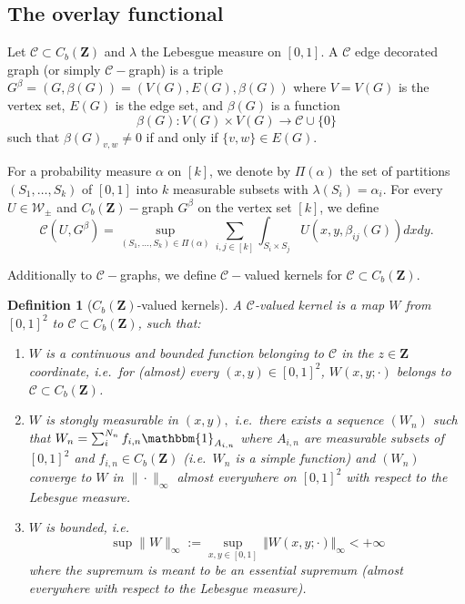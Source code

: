 \documentclass[11pt]{article}
\newtheorem{definition}[theorem]{Definition}
\newcommand{\cC}{{\mathcal C}}  %
\newcommand{\Space}{\mathbf{Z}}
\newcommand{\signed}{\pm}
\newcommand{\CbFunct}{C_b(\Space)}
\newcommand{\Kernel}{\mathcal{W}_{\signed}}
\newcommand{\TotalMass}[1]{\norm{#1}_\infty}
\newcommand{\norm}[1]{\Vert#1\Vert}
\begin{document}
\subsection{The overlay functional}
Let $\cC\subset \CbFunct$ and $\lambda$ the Lebesgue measure on $[0,1].$ A $\cC$ edge decorated graph (or simply $\cC-$graph) is a triple $G^{\beta}=(G,\beta(G))=(V(G),E(G),\beta(G))$ where $V=V(G)$ is the vertex set, $E(G)$ is the edge set, and $\beta(G)$ is a function
$$
\beta(G):V(G)\times V(G)\rightarrow \cC \cup \{0\}$$
such that $\beta(G)_{v,w}\neq 0$ if and only if $\{v,w\}\in E(G).$

For a probability measure $\alpha$ on $[k]$, we denote by $\Pi(\alpha)$ the set of partitions $\left(S_1, \ldots, S_k\right)$ of $[0,1]$ into $k$ measurable subsets with $\lambda\left(S_i\right)=\alpha_i$. For every $U\in \Kernel$ and $\CbFunct-$graph $G^{\beta}$ on the vertex set $[k]$, we define
\begin{equation}  \label{defiOverlay1}
\mathcal{C}(U, G^{\beta})=\sup _{\left(S_{ 1}, \ldots, S_k\right) \in \Pi(\alpha)} \sum_{i, j \in[k]}  \int_{S_i \times S_j} U(x, y,\beta_{i j}(G)) d x d y.
\end{equation}


Additionally to $\cC-$graphs, we define $\cC-$valued kernels for $\cC\subset \CbFunct $.

\begin{definition}[$\CbFunct$-valued kernels]\label{DefCBValuedKernel}
A \emph{$\cC$-valued kernel} is a map $W$ from $[0,1]^2$  to $\cC\subset\CbFunct$, 
such that:
\begin{enumerate}
\item   $W$  is  a continuous and bounded function belonging to $\cC$ in the $z\in \Space$ coordinate, i.e.\ for (almost) every $(x,y) \in [0,1]^2$, $W(x,y;\cdot)$ belongs to $\cC\subset \CbFunct$.
\item $W$ is \emph{stongly measurable} in $(x,y),$ i.e.\ there exists a sequence $(W_n)$ such that $W_n=\sum^{N_n}_if_{i,n}\mathbbm{1}_{A_{i,n}}$ where $A_{i,n}$ are measurable subsets of $[0,1]^2$ and $f_{i,n}\in \CbFunct $ (i.e.\ $W_n$ is a simple function) and $(W_n)$ converge to $W$ in $\|\cdot\|_{\infty}$ almost everywhere on $[0,1]^2$ with respect to the Lebesgue measure.
\item $W$ is \emph{bounded}, i.e.\
\begin{equation}
  \label{eq:def:TMCb}
\sup\|W\|_{\infty}:=    \sup_{x,y\in [0, 1] }\, \TotalMass{W(x, y; \cdot)} <+\infty 
  \end{equation}where the supremum is meant to be an essential supremum (almost everywhere with respect to the Lebesgue measure).

\end{enumerate}
\end{definition}
\end{document}
